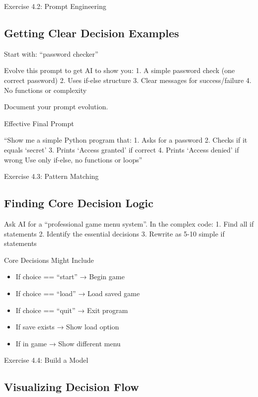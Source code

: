 \documentclass[
  letterpaper,
  DIV=11,
  numbers=noendperiod,
  oneside]{scrreprt}
\providecommand{\tightlist}{%
  \setlength{\itemsep}{0pt}\setlength{\parskip}{0pt}}\usepackage{longtable,booktabs,array}
\begin{document}
Exercise 4.2: Prompt Engineering

\subsection{Getting Clear Decision
Examples}\label{getting-clear-decision-examples}

Start with: ``password checker''

Evolve this prompt to get AI to show you: 1. A simple password check
(one correct password) 2. Uses if-else structure 3. Clear messages for
success/failure 4. No functions or complexity

Document your prompt evolution.

Effective Final Prompt

``Show me a simple Python program that: 1. Asks for a password 2. Checks
if it equals `secret' 3. Prints `Access granted' if correct 4. Prints
`Access denied' if wrong Use only if-else, no functions or loops''

Exercise 4.3: Pattern Matching

\subsection{Finding Core Decision
Logic}\label{finding-core-decision-logic}

Ask AI for a ``professional game menu system''. In the complex code: 1.
Find all if statements 2. Identify the essential decisions 3. Rewrite as
5-10 simple if statements

Core Decisions Might Include

\begin{itemize}
\tightlist
\item
  If choice == ``start'' → Begin game
\item
  If choice == ``load'' → Load saved game
\item
  If choice == ``quit'' → Exit program
\item
  If save exists → Show load option
\item
  If in game → Show different menu
\end{itemize}

Exercise 4.4: Build a Model

\subsection{Visualizing Decision Flow}\label{visualizing-decision-flow}
\end{document}

